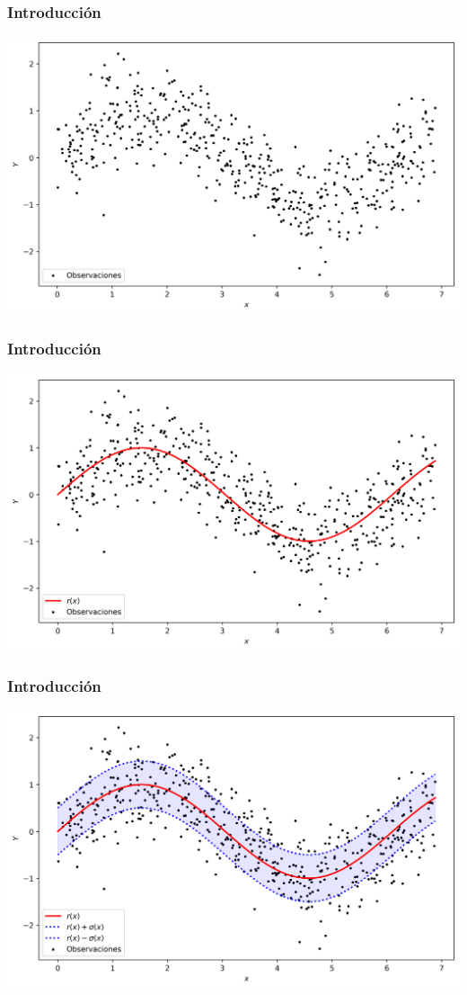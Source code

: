 \documentclass[aspectratio=169,spanish]{beamer}
\begin{document}
\begin{frame}
\frametitle{Introducción}
\center
\includegraphics[scale=0.5]{regresion}

\end{frame}
\begin{frame}
\frametitle{Introducción}
\center
\includegraphics[scale=0.5]{regresion1}

\end{frame}
\begin{frame}
\frametitle{Introducción}
\center
\includegraphics[scale=0.5]{regresion2}

\end{frame}
\end{document}
